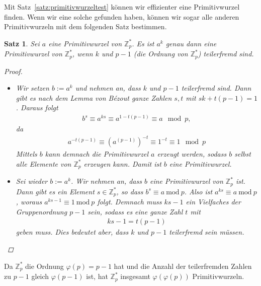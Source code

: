 \documentclass[
  a4paper,
  11pt,
]{scrartcl}
\theoremstyle{plain}
\newtheorem{satz}{Satz}
\theoremstyle{definition}
\theoremstyle{remark}
\newcommand{\Z}{\mathbb{Z}}
\newcommand{\Mod}[1]{\ \mathrm{mod}\ #1}
\begin{document}
Mit Satz~\ref{satz:primitivwurzeltest} können wir effizienter eine
Primitivwurzel finden. Wenn wir eine solche gefunden haben, können wir sogar
alle anderen Primitivwurzeln mit dem folgenden Satz bestimmen.

\begin{satz}\label{satz:primitivwurzeln_durch_potenzen}
  Sei $a$ eine Primitivwurzel von $\Z_p^*$. Es ist $a^k$ genau dann eine
  Primitivwurzel von $\Z_p^*$, wenn $k$ und $p-1$ (die Ordnung von $\Z_p^*$)
  teilerfremd sind.

  \begin{proof}
    \begin{itemize}
      \item[„$\Rightarrow$“] Wir setzen $b := a^k$ und nehmen an, dass $k$ und
        $p-1$ teilerfremd sind. Dann gibt es nach dem Lemma von Bézout ganze
        Zahlen $s, t$ mit $s k + t (p-1) = 1$. Daraus folgt
        \begin{align*}
          b^s \equiv a^{k s} \equiv a^{1 - t (p-1)} \equiv a \mod p,
        \end{align*}
        da
        \begin{align*}
          a^{- t (p-1)} \equiv {\left(a^{(p-1)}\right)}^{-t} \equiv 1^{-t} \equiv 1 \mod p
        \end{align*}
        Mittels $b$ kann demnach die Primitivwurzel $a$ erzeugt werden, sodass
        $b$ selbst alle Elemente von $\Z_p^*$ erzeugen kann. Damit ist $b$ eine
        Primitivwurzel.
      \item[„$\Leftarrow$“] Sei wieder $b := a^k$. Wir nehmen an, dass $b$ eine
        Primitivwurzel von $\Z_p^*$ ist. Dann gibt es ein Element
        $s \in \Z_p^*$, so dass $b^s \equiv a \Mod{p}$. Also ist
        $a^{ks} \equiv a \Mod{p}$, woraus $a^{ks - 1} \equiv 1 \Mod{p}$ folgt.
        Demnach muss $ks-1$ ein Vielfaches der Gruppenordnung $p-1$ sein, sodass
        es eine ganze Zahl $t$ mit
        \begin{align*}
          ks - 1 = t(p-1)
        \end{align*}
        geben muss. Dies bedeutet aber, dass $k$ und $p-1$ teilerfremd sein
        müssen.
    \end{itemize}
  \end{proof}
\end{satz}

Da $\Z_p^*$ die Ordnung $\varphi(p) = p-1$ hat und die Anzahl der teilerfremden
Zahlen zu $p-1$ gleich $\varphi(p-1)$ ist, hat $\Z_p^*$ insgesamt
$\varphi(\varphi(p))$ Primitivwurzeln.
\end{document}
